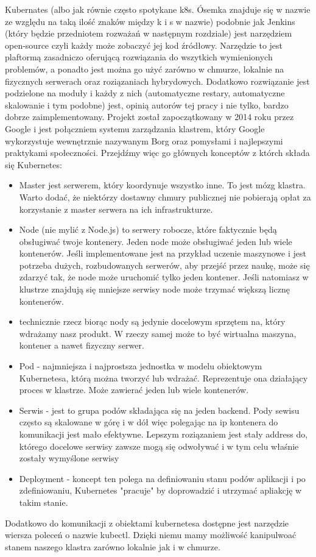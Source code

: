 Kubernates (albo jak równie często spotykane k8s. Ósemka znajduje się w nazwie ze względu na taką ilość znaków między k i s w nazwie) podobnie jak Jenkins (który będzie przedniotem rozważań w następnym rozdziale) jest narzędziem open-source czyli każdy może zobaczyć jej kod źródłowy. Narzędzie to jest plaftormą zasadniczo oferującą rozwiązania do wszytkich wymienionych problemów, a ponadto jest można go użyć zarówno w chmurze, lokalnie na fizycznych serwerach oraz roziązaniach hybrydowych. Dodatkowo rozwiązanie jest podzielone na moduły i każdy z nich (automatyczne restary, automatyczne skalowanie i tym podobne) jest, opinią autorów tej pracy i nie tylko, bardzo dobrze zaimplementowany. 
Projekt został zapoczątkowany w 2014 roku przez Google i jest połączniem systemu zarządzania klastrem, który Google wykorzystuje wewnętrznie nazywanym Borg oraz pomysłami i najlepszymi praktykami społeczności.
Przejdźmy więc go głównych konceptów z którch składa się Kubernetes:
\begin{itemize}
    \item Master jest serwerem, który koordynuje wszystko inne. To jest mózg klastra. Warto dodać, że niektórzy dostawny chmury publicznej nie pobierają opłat za korzystanie z master serwera na ich infrastrukturze. 
    \item Node (nie mylić z Node.js) to serwery robocze, które faktycznie będą obsługiwać twoje kontenery. Jeden node może obsługiwać jeden lub wiele kontenerów. Jeśli implementowane jest na przykład uczenie maszynowe i jest potrzeba dużych, rozbudowanych serwerów, aby przejść przez naukę, może się zdarzyć tak, że node może uruchomić tylko jeden kontener. Jeśli natomiasz w klustrze znajdują się mniejsze serwisy node może trzymać większą licznę kontenerów.
    \item technicznie rzecz biorąc nody są jedynie docelowym sprzętem na, który wdrażamy nasz produkt. W rzeczy samej może to być wirtualna maszyna, kontener a nawet fizyczny serwer. 
    \item Pod - najmniejsza i najprostsza jednostka w modelu obiektowym Kubernetesa, którą można tworzyć lub wdrażać. Reprezentuje ona działający proces w klastrze. Może zawierać jeden lub wiele kontenerów.
    \item Serwis - jest to grupa podów składająca się na jeden backend. Pody sewisu często są skalowane w górę i w dół więc polegając na ip kontenera do komunikacji jest mało efektywne. Lepszym roziązaniem jest stały address do, którego docelowe serwisy zawsze mogą się odwoływać i w tym celu właśnie zostały wymyślone serwisy
    \item Deployment - koncept ten polega na definiowaniu stanu podów aplikacji i po zdefiniowaniu, Kubernetes "pracuje" by doprowadzić i utrzymać apliakcję w takim stanie.
\end{itemize}

Dodatkowo do komunikacji z obiektami kubernetesa dostępne jest narzędzie wiersza poleceń o nazwie kubectl. Dzięki niemu mamy możliwość kanipulwoać stanem naszego klastra zarówno lokalnie jak i w chmurze.